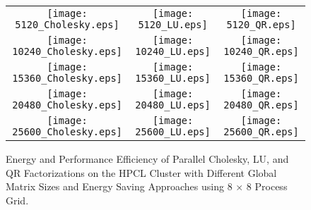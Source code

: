 \documentclass[12pt]{elsarticle}
\begin{document}
\begin{figure*}\vspace{-12mm}
\centering
\begin{tabular}{@{}ccc@{}}
\hspace{-23mm}\texttt{[image: 5120\_Cholesky.eps]} &
\hspace{-7mm}\texttt{[image: 5120\_LU.eps]} &
\hspace{-7mm}\texttt{[image: 5120\_QR.eps]}\\
\hspace{-22mm}\texttt{[image: 10240\_Cholesky.eps]} &
\hspace{-7mm}\texttt{[image: 10240\_LU.eps]} &
\hspace{-7mm}\texttt{[image: 10240\_QR.eps]}\\
\hspace{-22mm}\texttt{[image: 15360\_Cholesky.eps]} &
\hspace{-7mm}\texttt{[image: 15360\_LU.eps]} &
\hspace{-7mm}\texttt{[image: 15360\_QR.eps]}\\
\hspace{-22mm}\texttt{[image: 20480\_Cholesky.eps]} &
\hspace{-7mm}\texttt{[image: 20480\_LU.eps]} &
\hspace{-7mm}\texttt{[image: 20480\_QR.eps]}\\
\hspace{-22mm}\texttt{[image: 25600\_Cholesky.eps]} &
\hspace{-7mm}\texttt{[image: 25600\_LU.eps]} &
\hspace{-7mm}\texttt{[image: 25600\_QR.eps]}\\
\end{tabular}
\caption{Energy and Performance Efficiency of Parallel Cholesky, LU, and QR Factorizations on the HPCL Cluster with Different Global Matrix Sizes and Energy Saving Approaches using 8 $\times$ 8 Process Grid.}
\label{energy_performance_efficiency_hpcl}
\vspace{-0.0335mm}
\end{figure*}
\end{document}
